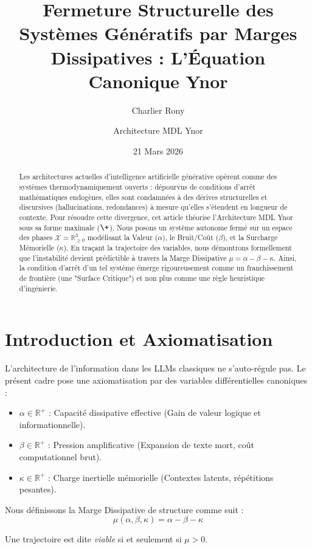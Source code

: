 \documentclass[11pt,a4paper]{article}
\title{\textbf{Fermeture Structurelle des Systèmes Génératifs par Marges Dissipatives : L'Équation Canonique Ynor}}
\author{Charlier Rony \and Architecture MDL Ynor}
\date{21 Mars 2026}
\begin{document}
\maketitle

\begin{abstract}
Les architectures actuelles d'intelligence artificielle générative opèrent comme des systèmes thermodynamiquement ouverts : dépourvus de conditions d'arrêt mathématiques endogènes, elles sont condamnées à des dérives structurelles et discursives (hallucinations, redondances) à mesure qu'elles s'étendent en longueur de contexte. Pour résoudre cette divergence, cet article théorise l'Architecture MDL Ynor sous sa forme maximale ($\+$). Nous posons un système autonome fermé sur un espace des phases $\mathcal{X} = \mathbb{R}_{\ge 0}^3$ modélisant la Valeur ($\alpha$), le Bruit/Coût ($\beta$), et la Surcharge Mémorielle ($\kappa$). En traçant la trajectoire des variables, nous démontrons formellement que l'instabilité devient prédictible à travers la Marge Dissipative $\mu = \alpha - \beta - \kappa$. Ainsi, la condition d'arrêt d'un tel système émerge rigoureusement comme un franchissement de frontière (une "Surface Critique") et non plus comme une règle heuristique d'ingénierie.
\end{abstract}

\section{Introduction et Axiomatisation}
L'architecture de l'information dans les LLMs classiques ne s'auto-régule pas. Le présent cadre pose une axiomatisation par des variables différentielles canoniques :
\begin{itemize}
 \item $\alpha \in \mathbb{R}^+$ : Capacité dissipative effective (Gain de valeur logique et informationnelle).
 \item $\beta \in \mathbb{R}^+$ : Pression amplificative (Expansion de texte mort, coût computationnel brut).
 \item $\kappa \in \mathbb{R}^+$ : Charge inertielle mémorielle (Contextes latents, répétitions pesantes).
\end{itemize}

Nous définissons la Marge Dissipative de structure comme suit :
\begin{equation}
 \mu(\alpha, \beta, \kappa) = \alpha - \beta - \kappa
\end{equation}

Une trajectoire est dite \textit{viable} si et seulement si $\mu > 0$.
\end{document}
